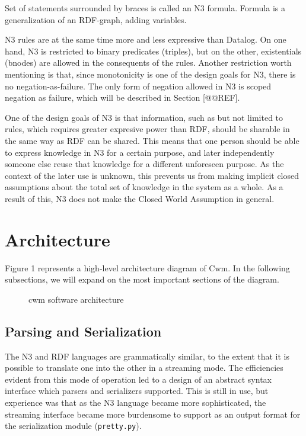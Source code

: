 \documentclass{tlp}
\begin{document}
\par Set of statements surrounded by braces is called an N3 formula.
Formula is a generalization of an RDF-graph, adding variables.

\par N3 rules are at the same time more and less expressive than
Datalog. On one hand, N3 is restricted to binary predicates
(triples), but on the other, existentials (bnodes) are allowed in
the consequents of the rules. Another restriction worth mentioning
is that, since monotonicity is one of the design goals for N3,
there is no negation-as-failure. The only form of negation allowed
in N3 is scoped negation as failure, which will be described in
Section [@@REF].

\par One of the design goals of N3 is that information, such as but
not limited to rules, which requires greater expresive power than
RDF, should be sharable in the same way as RDF can be shared. This
means that one person should be able to express knowledge in N3 for
a certain purpose, and later independently someone else reuse that
knowledge for a different unforeseen purpose. As the context of the
later use is unknown, this prevents us from making implicit closed
assumptions about the total set of knowledge in the system as a
whole. As a result of this, N3 does not make the Closed World
Assumption in general.
\section{Architecture}
  

\par Figure 1 represents a high-level architecture diagram of Cwm. In
the following subsections, we will expand on the most important
sections of the diagram.
\begin{figure}[tb]
\centerline{}

\caption{cwm software architecture}\label{cwmarch}

\end{figure}

\subsection{Parsing and Serialization}
  

\par The N3 and RDF languages are grammatically similar, to the
extent that it is possible to translate one into the other in a
streaming mode. The efficiencies evident from this mode of
operation led to a design of an abstract syntax interface which
parsers and serializers supported. This is still in use, but
experience was that as the N3 language became more sophisticated,
the streaming interface became more burdensome to support as an
output format for the serialization module
({\tt pretty.py}).
\end{document}
